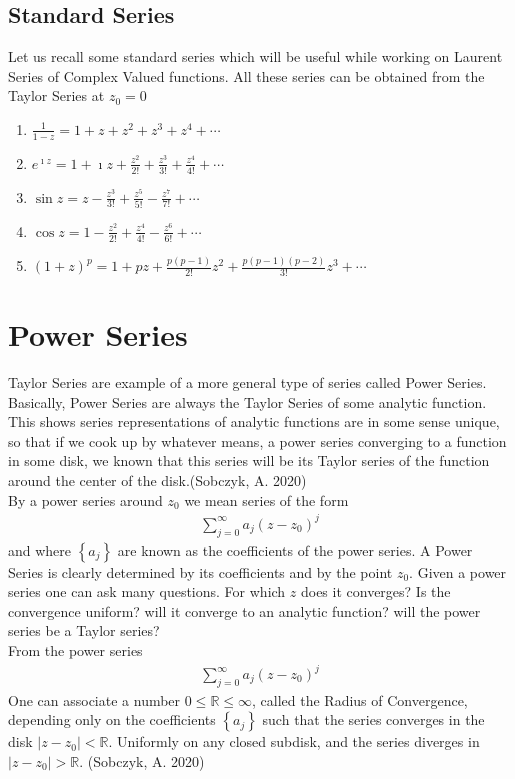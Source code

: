 \documentclass[11pt]{report}
\newcommand{\dsp}{\displaystyle}
\newcommand{\NI}{\noindent}
\newcommand{\real}{ \mathbb{R}}
\newcommand{\imaginary}{\imath}
\begin{document}
	\subsection{Standard Series}
	Let us recall some standard series which will be useful while working on Laurent Series of Complex Valued functions. All these series can be obtained from the Taylor Series at $z_0 = 0$
	\begin{enumerate}
		\item $\dsp \frac{1}{1-z}=1+z+z^2 + z^3 + z^4 + \cdots$
		\item $\dsp e^{\imaginary z} = 1+\imaginary z + \frac{z^2}{2!} + \frac{z^3}{3!} + \frac{z^4}{4!} + \cdots$
		\item $\dsp \sin z = z - \frac{z^3}{3!} + \frac{z^5}{5!} - \frac{z^7}{7!} + \cdots$
		\item $\dsp \cos z = 1 - \frac{z^2}{2!} + \frac{z^4}{4!} - \frac{z^6}{6!}+\cdots$
		\item $\dsp (1+z)^p = 1+ pz + \frac{p(p-1)}{2!}z^2 + \frac{p(p-1)(p-2)}{3!}z^3 + \cdots$
	\end{enumerate}
	
	\section{Power Series}
	Taylor Series are example of a more general type of series called Power Series. Basically, Power Series are always the Taylor Series of some analytic function. This shows series representations of analytic functions are in some sense unique, so that if we cook up by whatever means, a power series converging to a function in some disk, we known that this series will be its Taylor series of the function around the center of the disk.(Sobczyk, A. 2020)\\
	
	\NI By a power series around $z_0$ we mean series of the form
	\begin{eqnarray}
		\sum_{j=0}^{\infty}a_j(z-z_0)^j
	\end{eqnarray}
	and where $\left\{a_j\right\}$ are known as the coefficients of the power series. A Power Series is clearly determined by its coefficients and by the point $z_0$. Given a power series one can ask many questions. For which $z$ does it converges? Is the convergence uniform? will it converge to an analytic function? will the power series be a Taylor series?\\
	From the power series
	\begin{eqnarray*}
			\sum_{j=0}^{\infty}a_j(z-z_0)^j
	\end{eqnarray*}
	One can associate a number $0 \leq \real \leq \infty$, called the Radius of Convergence, depending only on the coefficients  $\left\{a_j\right\}$ such that the series converges in the disk $|z-z_0|< \real$. Uniformly on any closed subdisk, and the series diverges in $|z-z_0|> \real$. (Sobczyk, A. 2020)
	
\end{document}
